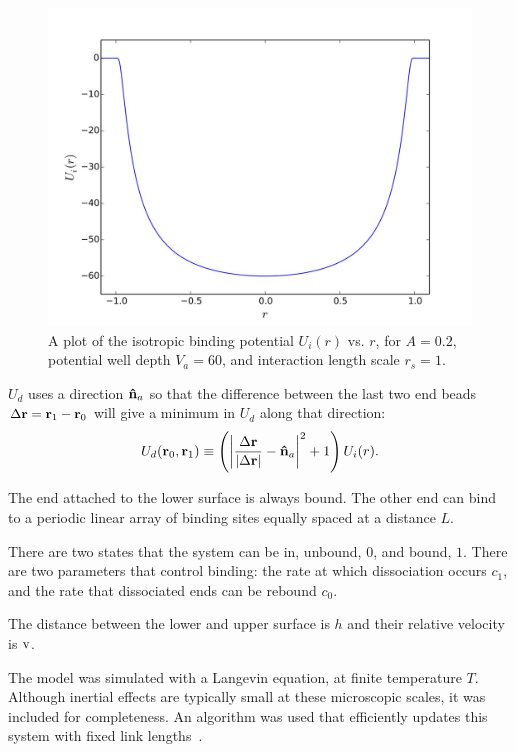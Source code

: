 \documentclass[11pt]{ucthesis}
\def\br{{\bf r}}
\def\delr{{\Delta \br}}
\def\nhat{{\bf\hat n}}
\begin{document}
\begin{figure}[htp]
\begin{center}
\includegraphics[width=\textwidth]{expVplot}
\caption{
A plot of the isotropic binding potential $U_i(r)$ vs. $r$, for $A=0.2$, potential well depth $V_a = 60$, and interaction length scale $r_s = 1$. 
}
\label{fig:expVplot}
\end{center}
\end{figure}

$U_d$ uses a direction $\nhat_a$ so that the difference
between the last two end beads $\delr = \br_1- \br_0$ will give a minimum in $U_d$
along that direction:
\begin{equation}
U_d(\br_0, \br_1) \equiv \left( \left| \frac{\delr}{|\delr|}-\nhat_a \right|^2 + 1 \right) U_i(r) .
\end{equation}

The end attached to the lower surface is always bound. The other end can bind to
a periodic linear array of binding sites equally spaced at a distance $L$.

There are two states that the system can be in, unbound, $0$, and bound, $1$. 
There are two parameters that control binding: the rate at which dissociation
occurs $c_1$, and the rate that dissociated ends can be rebound $c_0$.

The distance between the lower and upper surface is $h$ and their relative
velocity is $\rm v$.

The model was simulated with a Langevin equation, at finite temperature $T$.
Although inertial effects are typically small at these microscopic scales, it
was included for completeness. An algorithm was used that efficiently updates
this system with fixed link lengths~\cite{DeutschCerfFriction}.
\end{document}
